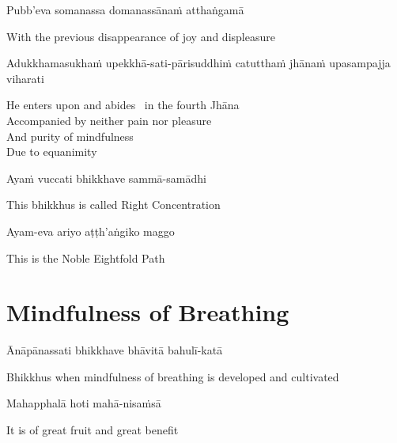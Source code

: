 Pubb’eva somanassa domanassānaṁ atthaṅgamā

\begin{cprenglish}
  With the previous disappearance of joy and displeasure
\end{cprenglish}

Adukkhamasukhaṁ upekkhā-sati-pārisuddhiṁ catutthaṁ jhānaṁ upasampajja viharati

\begin{cprenglish}
  He enters upon and abides \breathmark\ in the fourth Jhāna\\
  Accompanied by neither pain nor pleasure\\
  And purity of mindfulness\\
  Due to equanimity
\end{cprenglish}

Ayaṁ vuccati bhikkhave sammā-samādhi

\begin{cprenglish}
  This bhikkhus is called Right Concentration
\end{cprenglish}

Ayam-eva ariyo aṭṭh'aṅgiko maggo

\begin{cprenglish}
  This is the Noble Eightfold Path
\end{cprenglish}

\suttaRef{[SN 45.8]}

\clearpage

\section{Mindfulness of Breathing}
\label{mindfulness-of-breathing}

\begin{leader}
\end{leader}

Ānāpānassati bhikkhave bhāvitā bahulī-katā

\begin{cprenglish}
  Bhikkhus when mindfulness of breathing is developed and cultivated
\end{cprenglish}

Mahapphalā hoti mahā-nisaṁsā

\begin{cprenglish}
  It is of great fruit and great benefit
\end{cprenglish}

